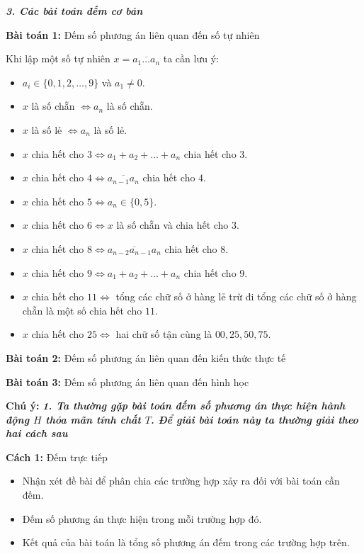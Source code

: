 \textbf{\textit{3. Các bài toán đếm cơ bản}}

\textbf{Bài toán 1:} Đếm số phương án liên quan đến số tự nhiên

Khi lập một số tự nhiên $x=\overline{a_1\ldots a_n}$ ta cần lưu ý:
\begin{itemize}
	\item $a_i\in\{0,1,2,\ldots,9\}$ và $a_1\ne 0$.
	\item $x$ là số chẵn $\Leftrightarrow a_n$ là số chẵn.
	\item $x$ là số lẻ $\Leftrightarrow a_n$ là số lẻ.
	\item $x$ chia hết cho $3\Leftrightarrow a_1+a_2+\ldots+a_n$ chia hết cho $3$.
	\item $x$ chia hết cho $4\Leftrightarrow\overline{a_{n-1}a_n}$ chia hết cho $4$.
	\item $x$ chia hết cho $5\Leftrightarrow a_n\in\{0,5\}$.
	\item $x$ chia hết cho $6\Leftrightarrow x$ là số chẵn và chia hết cho $3$.
	\item $x$ chia hết cho $8\Leftrightarrow\overline{a_{n-2}a_{n-1}a_n}$ chia hết cho $8$.
	\item $x$ chia hết cho $9\Leftrightarrow a_1+a_2+\ldots+a_n$ chia hết cho $9$.
	\item $x$ chia hết cho $11\Leftrightarrow$ tổng các chữ số ở hàng lẻ trừ đi tổng các chữ số ở hàng chẵn là một số chia hết cho $11$.
	\item $x$ chia hết cho $25\Leftrightarrow$ hai chữ số tận cùng là $00,25,50,75$.
\end{itemize}

\textbf{Bài toán 2:} Đếm số phương án liên quan đến kiến thức thực tế

\textbf{Bài toán 3:} Đếm số phương án liên quan đến hình học

\textbf{Chú ý:} \textbf{\textit{1. Ta thường gặp bài toán đếm số phương án thực hiện hành động $H$ thỏa mãn tính chất $T$. Để giải bài toán này ta thường giải theo hai cách sau}}

\textbf{Cách 1:} Đếm trực tiếp
\begin{itemize}
	\item Nhận xét đề bài để phân chia các trường hợp xảy ra đối với bài toán cần đếm.
	\item Đếm số phương án thực hiện trong mỗi trường hợp đó.
	\item Kết quả của bài toán là tổng số phương án đếm trong các trường hợp trên.
\end{itemize}


